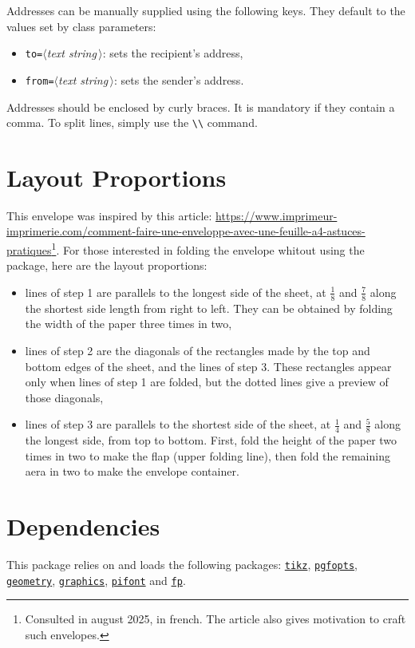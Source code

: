 \documentclass{article}
\newcommand{\optarg}[1]{$\langle$\textit{#1}\,$\rangle$}
\begin{document}
		Addresses can be manually supplied using the following keys. They default to the values set by class parameters:
		\begin{itemize}
			\item \verb|to=|\optarg{text string}: sets the recipient's address,
			\item \verb|from=|\optarg{text string}: sets the sender's address.
		\end{itemize}
		Addresses should be enclosed by curly braces. It is mandatory if they contain a comma. To split lines, simply use the \verb|\\| command.

	\section{Layout Proportions}
		This envelope was inspired by this article: \url{https://www.imprimeur-imprimerie.com/comment-faire-une-enveloppe-avec-une-feuille-a4-astuces-pratiques}\footnote{Consulted in august 2025, in french. The article also gives motivation to craft such envelopes.}. For those interested in folding the envelope whitout using the package, here are the layout proportions:
		\begin{itemize}
			\item lines of step 1 are parallels to the longest side of the sheet, at $\frac{1}{8}$ and $\frac{7}{8}$ along the shortest side length from right to left. They can be obtained by folding the width of the paper three times in two,
			\item lines of step 2 are the diagonals of the rectangles made by the top and bottom edges of the sheet, and the lines of step 3. These rectangles appear only when lines of step 1 are folded, but the dotted lines give a preview of those diagonals,
			\item lines of step 3 are parallels to the shortest side of the sheet, at $\frac{1}{4}$ and $\frac{5}{8}$ along the longest side, from top to bottom. First, fold the height of the paper two times in two to make the flap (upper folding line), then fold the remaining aera in two to make the envelope container.
		\end{itemize}

	\section{Dependencies}
			This package relies on and loads the following packages: \href{https://ctan.org/pkg/tikz}{\texttt{tikz}}, \href{https://ctan.org/pkg/pgfopts}{\texttt{pgfopts}}, \href{https://ctan.org/pkg/geometry}{\texttt{geometry}}, \href{https://ctan.org/pkg/graphics}{\texttt{graphics}}, \href{https://ctan.org/pkg/pifont}{\texttt{pifont}} and \href{https://ctan.org/pkg/fp}{\texttt{fp}}.
\end{document}
